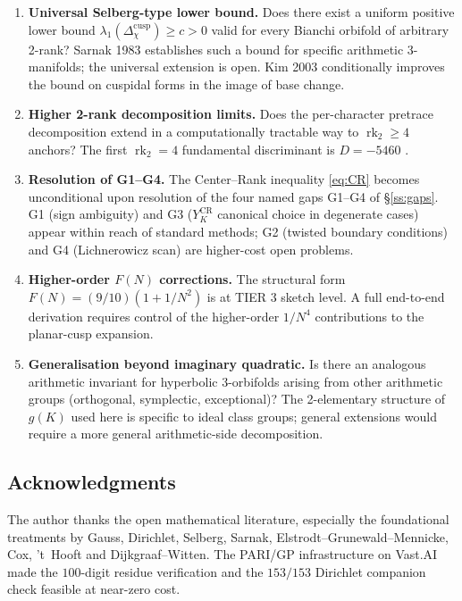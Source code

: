 \documentclass[11pt,a4paper,reqno]{amsart}
\theoremstyle{definition}
\DeclareMathOperator{\rk}{rk}
\newcommand{\gK}{g(K)}
\newcommand{\YKCR}{Y_K^{\mathrm{CR}}}
\begin{document}
\begin{enumerate}[label=\textup{(Q\arabic*)},leftmargin=2em]
  \item \textbf{Universal Selberg-type lower bound.} Does there exist a
        uniform positive lower bound
        $\lambda_1(\Delta_\chi^{\mathrm{cusp}})\ge c>0$ valid for every
        Bianchi orbifold of arbitrary 2-rank?  Sarnak 1983 \cite{Sarnak1983}
        establishes such a bound for specific arithmetic 3-manifolds;
        the universal extension is open.  Kim 2003 \cite{Kim2003}
        conditionally improves the bound on cuspidal forms in the image of
        base change.
  \item \textbf{Higher 2-rank decomposition limits.} Does the per-character
        pretrace decomposition extend in a computationally tractable way to
        $\rk_2\ge 4$ anchors?  The first $\rk_2=4$ fundamental discriminant
        is $D=-5460$ \cite{Remondiere2026Faltings}.
  \item \textbf{Resolution of G1--G4.} The Center--Rank inequality
        \eqref{eq:CR} becomes unconditional upon resolution of the four
        named gaps G1--G4 of \S\ref{ss:gaps}.  G1 (sign ambiguity) and
        G3 ($\YKCR$ canonical choice in degenerate cases) appear within
        reach of standard methods; G2 (twisted boundary conditions) and
        G4 (Lichnerowicz scan) are higher-cost open problems.
  \item \textbf{Higher-order $F(N)$ corrections.} The structural form
        $F(N) = (9/10)(1+1/N^2)$ is at TIER 3 sketch level.  A full
        end-to-end derivation requires control of the higher-order
        $1/N^4$ contributions to the planar-cusp expansion.
  \item \textbf{Generalisation beyond imaginary quadratic.} Is there an
        analogous arithmetic invariant for hyperbolic 3-orbifolds arising
        from other arithmetic groups (orthogonal, symplectic, exceptional)?
        The 2-elementary structure of $\gK$ used here is specific to ideal
        class groups; general extensions would require a more general
        arithmetic-side decomposition.
\end{enumerate}

\subsection*{Acknowledgments}
The author thanks the open mathematical literature, especially the
foundational treatments by Gauss, Dirichlet, Selberg, Sarnak,
Elstrodt--Grunewald--Mennicke, Cox, 't~Hooft and Dijkgraaf--Witten.  The
PARI/GP infrastructure on Vast.AI made the $100$-digit residue verification
and the $153/153$ Dirichlet companion check feasible at near-zero cost.



\end{document}

